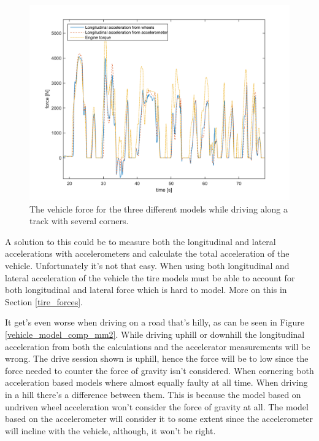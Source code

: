 \begin{figure}[h]
	\centering
	\includegraphics[width=1\textwidth]{Pictures/vehicle_model_comp_race}
	\caption{The vehicle force for the three different models while driving along a track with several corners.}
	\label{vehicle_model_comp_race}
\end{figure}

A solution to this could be to measure both the longitudinal and lateral accelerations with accelerometers and calculate the total acceleration of the vehicle. Unfortunately it's not that easy. When using both longitudinal and lateral acceleration of the vehicle the tire models must be able to account for both longitudinal and lateral force which is hard to model. More on this in Section \ref{tire_forces}.

It get's even worse when driving on a road that's hilly, as can be seen in Figure \ref{vehicle_model_comp_mm2}. While driving uphill or downhill the longitudinal acceleration from both the calculations and the accelerator measurements will be wrong. The drive session shown is uphill, hence the force will be to low since the force needed to counter the force of gravity isn't considered. When cornering both acceleration based models where almost equally faulty at all time. When driving in a hill there's a difference between them. This is because the model based on undriven wheel acceleration won't consider the force of gravity at all. The model based on the accelerometer will consider it to some extent since the accelerometer will incline with the vehicle, although, it won't be right.

